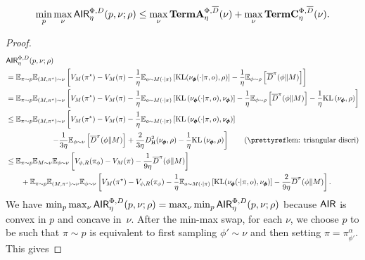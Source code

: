 \begin{lemma}\label{lem: air by comp}
\begin{align*}
    \min_p \max_\nu \mathsf{AIR}_\eta^{\Phi, D}(p, \nu; \rho) \leq \max_\nu \textbf{\textup{TermA}}_\eta^{\Phi, \overline{D}}(\nu) + \max_\nu \textbf{\textup{TermC}}_\eta^{\Phi, \overline{D}}(\nu).  
\end{align*}
\end{lemma}
\begin{proof}
    \begin{align*}
    & \air_\eta^{\Phi, D}(p, \nu; \rho)\\
    &= \E_{\pi\sim p}\E_{(M, \pi^\star) \sim \nu}\left[ V_{M}(\pi^\star) - V_M(\pi) - \frac{1}{\eta}\E_{o\sim M(\cdot|\pi)}\left[\KL(\nu_{\bo{\phi}}(\cdot|\pi, o), \rho)\right] - \frac{1}{\eta} \E_{\phi\sim \rho}\left[\tilD^\pi(\phi\|M)\right]  \right]
    \\&= \E_{\pi\sim p}\E_{(M, \pi^\star) \sim \nu}\left[ V_{M}(\pi^\star) - V_M(\pi) - \frac{1}{\eta}\E_{o\sim M(\cdot|\pi)}\left[\KL\left(\nu_{\bo{\phi}}(\cdot|\pi, o), \nu_{\bo{\phi}}\right)\right] - \frac{1}{\eta} \E_{\phi\sim \rho}\left[\tilD^\pi(\phi\|M)\right]  - \frac{1}{\eta}\KL\left(\nu_{\pmb{\phi}}, \rho\right) \right]
    \\&\le \E_{\pi\sim p}\E_{(M, \pi^\star) \sim \nu}\left[ V_{M}(\pi^\star) - V_M(\pi) - \frac{1}{\eta}\E_{o\sim M(\cdot|\pi)}\left[\KL\left(\nu_{\bo{\phi}}(\cdot|\pi, o), \nu_{\bo{\phi}}\right)\right]\right. 
    \\& \qquad \qquad \qquad  \left. - \frac{1}{3\eta} \E_{\phi\sim \nu}\left[\tilD^\pi(\phi\|M)\right]  + \frac{2}{3\eta}D_{\textup{H}}^2(\nu_{\pmb{\phi}}, \rho) - \frac{1}{\eta}\KL\left(\nu_{\pmb{\phi}}, \rho\right) \right] \tag{\pref{lem: triangular discri}}
    \\&\le \E_{\pi\sim p}\E_{M \sim \nu}\E_{\phi \sim \nu}\left[  V_{\phi, R}(\pi_{\phi}) - V_M(\pi) - \frac{1}{9\eta} \tilD^\pi(\phi\|M)\right]
    \\& \qquad + \E_{\pi\sim p}\E_{(M, \pi^\star) \sim \nu}\E_{\phi \sim \nu}\left[ V_M(\pi^\star) - V_{\phi, R}(\pi_{\phi}) - \frac{1}{\eta}\E_{o\sim M(\cdot|\pi)}\left[\KL(\nu_{\bo{\phi}}(\cdot|\pi, o), \nu_{\pmb{\phi}})\right] - \frac{2}{9\eta} \tilD^\pi(\phi\|M)\right]. 
\end{align*}    
    We have $\min_p \max_\nu \mathsf{AIR}_\eta^{\Phi, D}(p, \nu; \rho) = \max_\nu \min_p \mathsf{AIR}_\eta^{\Phi, D}(p, \nu; \rho)$ because $\mathsf{AIR}$ is convex in $p$ and concave in~$\nu$. After the min-max swap, for each $\nu$, we choose $p$ to be such that $\pi\sim p$ is equivalent to first sampling $\phi'\sim \nu$ and then setting $\pi=\pi_{\phi'}^\alpha$. This gives 

\end{proof}
